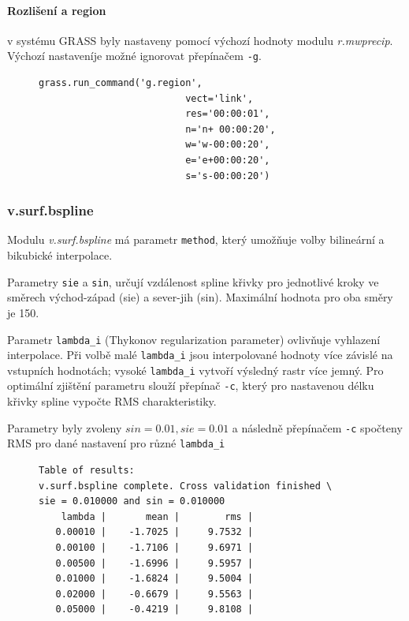 \documentclass[a4paper,12pt,oneside]{report}
\begin{document}
\paragraph*{Rozlišení a region} v systému GRASS byly nastaveny pomocí výchozí hodnoty modulu \textit{r.mwprecip}. Výchozí nastaveníje možné ignorovat přepínačem \texttt{-g}.
\begin{figure}[h!]
\begin{footnotesize}
\lstset{extendedchars=false,
escapeinside=''}
\begin{lstlisting}[style=mybash]
        grass.run_command('g.region',
                          vect='link',
                          res='00:00:01',
                          n='n+ 00:00:20',
                          w='w-00:00:20',
                          e='e+00:00:20',
                          s='s-00:00:20')
\end{lstlisting}
\end{footnotesize} 
\end{figure}



\subsubsection*{v.surf.bspline}
Modulu \textit{v.surf.bspline} má parametr \texttt{method}, který umožňuje volby bilineární a bikubické interpolace.

\begin{description}

\item Parametry \texttt{sie} a \texttt{sin}, určují vzdálenost spline křivky pro jednotlivé kroky ve směrech východ-západ (sie) a sever-jih (sin). Maximální hodnota pro oba směry je 150.

\item Parametr \texttt{lambda\_i} (Thykonov regularization parameter) ovlivňuje vyhlazení interpolace. Při volbě malé \texttt{lambda\_i} jsou interpolované hodnoty více závislé na vstupních hodnotách; vysoké \texttt{lambda\_i} vytvoří výsledný rastr více jemný. Pro optimální zjištění parametru slouží přepínač \texttt{-c}, který pro nastavenou délku křivky spline vypočte RMS charakteristiky.
\end{description}


Parametry byly zvoleny $sin=0.01, sie=0.01$ a následně přepínačem \texttt{-c} spočteny RMS pro dané nastavení pro různé \texttt{lambda\_i} 
\begin{figure}[h!]
\begin{footnotesize}
\lstset{extendedchars=false,
escapeinside=''}
\begin{lstlisting}[style=mybash]
Table of results:
v.surf.bspline complete. Cross validation finished \
sie = 0.010000 and sin = 0.010000
    lambda |       mean |        rms |
   0.00010 |    -1.7025 |     9.7532 |
   0.00100 |    -1.7106 |     9.6971 |
   0.00500 |    -1.6996 |     9.5957 |
   0.01000 |    -1.6824 |     9.5004 |
   0.02000 |    -0.6679 |     9.5563 |
   0.05000 |    -0.4219 |     9.8108 |
\end{lstlisting}
\end{footnotesize} 
\end{figure}
\end{document}
